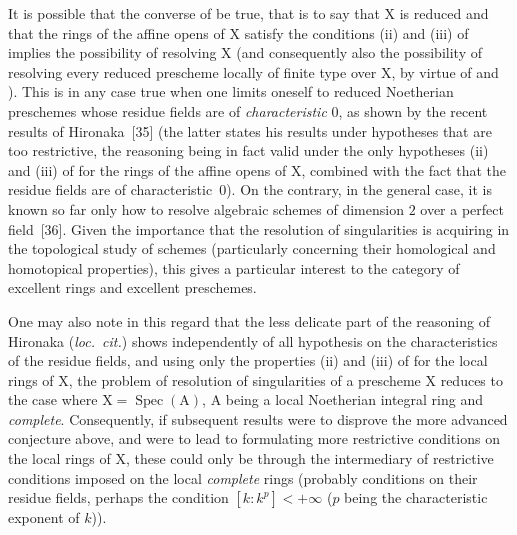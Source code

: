 \begin{remark}[7.9.6]
\label{IV.7.9.6}
It is possible that the converse of  be true, that is to say that $\mathrm{X}$ is reduced and that the rings of the affine opens of $\mathrm{X}$ satisfy the conditions (ii) and (iii) of  implies the possibility of resolving $\mathrm{X}$ (and consequently also the possibility of resolving every reduced prescheme locally of finite type over $\mathrm{X}$, by virtue of  and ). This is in any case true when one limits oneself to reduced Noetherian preschemes whose residue fields are of \emph{characteristic} $0$, as shown by the recent results of Hironaka~[35] (the latter states his results under hypotheses that are too restrictive, the reasoning being in fact valid under the only hypotheses (ii) and (iii) of  for the rings of the affine opens of $\mathrm{X}$, combined with the fact that the residue fields are of characteristic~$0$). On the contrary, in the general case, it is known so far only how to resolve algebraic schemes of dimension $2$ over a perfect field~[36]. Given the importance that the resolution of singularities is acquiring in the topological study of schemes (particularly concerning their homological and homotopical properties), this gives a particular interest to the category of excellent rings and excellent preschemes.

One may also note in this regard that the less delicate part of the reasoning of Hironaka (\emph{loc.\ cit.}) shows independently of all hypothesis on the characteristics of the residue fields, and using only the properties (ii) and (iii) of  for the local rings of $\mathrm{X}$, the problem of resolution of singularities of a prescheme $\mathrm{X}$ reduces to the case where $\mathrm{X}=\operatorname{Spec}(\mathrm{A})$, $\mathrm{A}$ being a local Noetherian integral ring and \emph{complete}. Consequently, if subsequent results were to disprove the more advanced conjecture above, and were to lead to formulating more restrictive conditions on the local rings of $\mathrm{X}$, these could only be through the intermediary of restrictive conditions imposed on the local \emph{complete} rings (probably conditions on their residue fields, perhaps the condition $[k:k^p]<+\infty$ ($p$ being the characteristic exponent of $k$)).
\end{remark}

